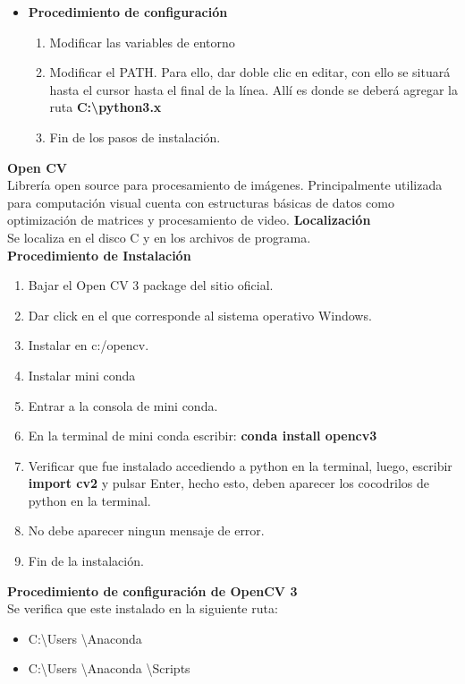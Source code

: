 \begin{itemize}
        \item \textbf{Procedimiento de configuración}
        \\
        \begin{enumerate}
            \item Modificar las variables de entorno
            \item Modificar el PATH. Para ello, dar doble clic en editar, con ello se 
            situará hasta el cursor hasta el final de la línea. Allí es donde se deberá 
            agregar la ruta \textbf{C:\textbackslash{python3.x}}
            \item Fin de los pasos de instalación.
        \end{enumerate}
\end{itemize}  

\textbf{Open CV}
\\
Librería open source para procesamiento de imágenes. Principalmente utilizada para
computación visual cuenta con estructuras básicas de datos como optimización de matrices
y procesamiento de video.
\textbf{Localización}
\\
Se localiza en el disco C y en los archivos de programa.
\\
\textbf{Procedimiento de Instalación}
\\
\begin{enumerate}
    \item Bajar el Open CV 3 package del sitio oficial. 
    \item Dar click en el que corresponde al sistema operativo Windows.
    \item Instalar en c:/opencv.
    \item Instalar mini conda 
    \item Entrar a la consola de mini conda. 
    \item En la terminal de mini conda escribir: \textbf{conda install opencv3}
    \item Verificar que fue instalado accediendo a python en la terminal, luego, escribir
    \textbf{import cv2} y pulsar Enter, hecho esto, deben aparecer los cocodrilos de python
    en la terminal.
    \item No debe aparecer ningun mensaje de error.
    \item Fin de la instalación.
\end{enumerate}
\textbf{Procedimiento de configuración de OpenCV 3}
\\
Se verifica que este instalado en la siguiente ruta:
\begin{itemize}
    \item C:\textbackslash{Users} \textbackslash{Anaconda}
    \item C:\textbackslash{Users} \textbackslash{Anaconda} \textbackslash{Scripts}
\end{itemize}
